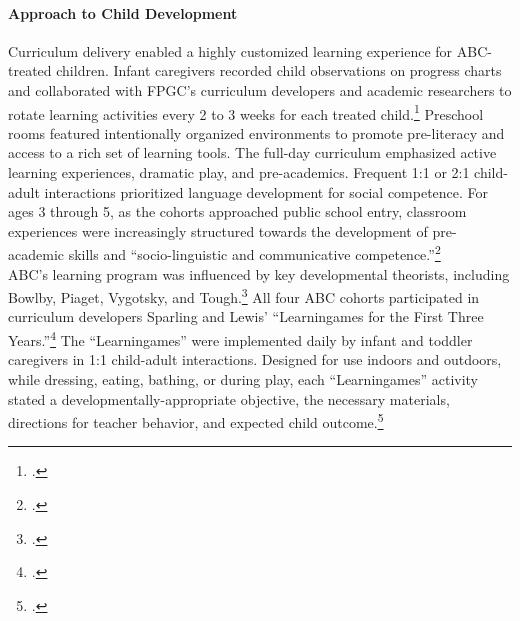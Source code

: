 \begin{appendices}
\paragraph{Approach to Child Development}
\noindent Curriculum delivery enabled a highly customized learning experience for ABC-treated children. Infant caregivers recorded child observations on progress charts and collaborated with FPGC's curriculum developers and academic researchers to rotate learning activities every 2 to 3 weeks for each treated child.\footnote{\citet{Ramey_Collier_etal_1976_CarolinaAbecedarianProject,Campbell_Ramey_1994_CD}.} Preschool rooms featured intentionally organized environments to promote pre-literacy and access to a rich set of learning tools. The full-day curriculum emphasized active learning experiences, dramatic play, and pre-academics. Frequent 1:1 or 2:1 child-adult interactions prioritized language development for social competence. For ages 3 through 5, as the cohorts approached public school entry, classroom experiences were increasingly structured  towards the development of pre-academic skills and ``socio-linguistic and communicative competence.''\footnote{\citet{Ramey-et-al_1977_Intro-to-ABC, Haskins_1985_CD, Ramey_1981_Modification, Ramey_Campbell_1979_SR, Ramey_Smith_1977_AJMD, Ramey_McGinness_etal_1982_Abecedarianapproach, Sparling_Lewis_1979_BOOKLearninggamesFirstThree,Sparling_Lewis_1984_BOOKLearningGamesThreesFours}.}\\

\noindent ABC's learning program was influenced by key developmental theorists, including Bowlby, Piaget, Vygotsky, and Tough.\footnote{\citet{Sparling_1974_Synth_Edu_Infant_SPEECH,Mcginness_1981_Developing,abc2014-2015interviews}.} All four ABC cohorts participated in curriculum developers Sparling and Lewis' ``Learningames for the First Three Years.''\footnote{ \citet{Sparling_Lewis_1979_BOOKLearninggamesFirstThree}.} The ``Learningames'' were implemented daily by infant and toddler caregivers in 1:1 child-adult interactions. Designed for use indoors and outdoors, while dressing, eating, bathing, or during play, each ``Learningames'' activity stated a developmentally-appropriate objective, the necessary materials, directions for teacher behavior, and expected child outcome.\footnote{\citet{Ramey_Campbell_1979_SR, Ramey_1981_Modification,Sparling_Lewis_1979_BOOKLearninggamesFirstThree}.}\\


\end{appendices}
